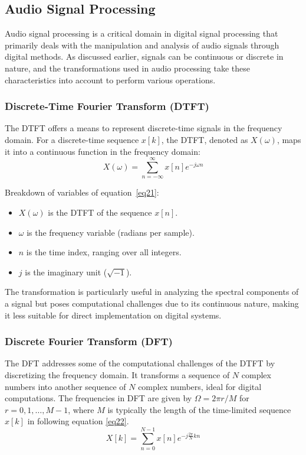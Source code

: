 \subsection{Audio Signal Processing}
Audio signal processing is a critical domain in digital signal processing that primarily deals with the manipulation and analysis of audio signals through digital methods. As discussed earlier, signals can be continuous or discrete in nature, and the transformations used in audio processing take these characteristics into account to perform various operations.

\subsubsection{Discrete-Time Fourier Transform (DTFT)}
The DTFT offers a means to represent discrete-time signals in the frequency domain. For a discrete-time sequence \( x[k] \), the DTFT, denoted as \( X(\omega) \), maps it into a continuous function in the frequency domain:
\begin{equation}
\label{eq21}
X(\omega)=\sum_{n=-\infty}^{\infty} x[n] e^{-j \omega n}
\end{equation}

\noindent Breakdown of variables of equation~\ref{eq21}:
\begin{itemize}
    \item \( X(\omega) \) is the DTFT of the sequence \( x[n] \).
    \item \( \omega \) is the frequency variable (radians per sample).
    \item \( n \) is the time index, ranging over all integers.
    \item \( j \) is the imaginary unit (\( \sqrt{-1} \)).
\end{itemize}
The transformation is particularly useful in analyzing the spectral components of a signal but poses computational challenges due to its continuous nature, making it less suitable for direct implementation on digital systems.

\subsubsection{Discrete Fourier Transform (DFT)}
The DFT addresses some of the computational challenges of the DTFT by discretizing the frequency domain. It transforms a sequence of \( N \) complex numbers into another sequence of \( N \) complex numbers, ideal for digital computations. The frequencies in DFT are given by \( \Omega = 2\pi r/M \) for \( r = 0, 1, \ldots, M-1 \), where \( M \) is typically the length of the time-limited sequence \( x[k] \) in following equation \ref{eq22}.
\begin{equation}
\label{eq22}
X[k]=\sum_{n=0}^{N-1} x[n] e^{-j \frac{2 \pi}{N} k n}
\end{equation}

